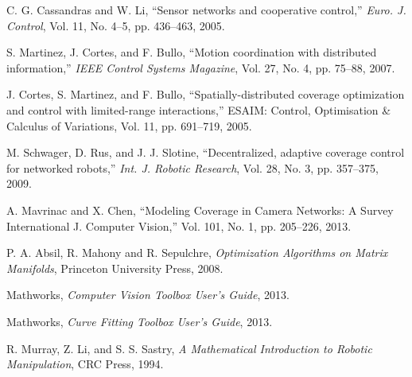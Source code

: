 \documentclass[conference,letterpaper]{ieeeconf}
\begin{document}
\begin{thebibliography}{99}
C. G. Cassandras and W. Li, 
``Sensor networks and cooperative control,''
{\it Euro. J. Control}, Vol. 11, No. 4--5, pp. 436--463, 2005.


S. Martinez, J. Cortes, and F. Bullo,
``Motion coordination with distributed information,'' 
{\it IEEE Control Systems Magazine}, Vol. 27, No. 4, pp. 75--88, 2007.

J. Cortes, S. Martinez, and F. Bullo, 
``Spatially-distributed coverage optimization and control with limited-range interactions,'' 
ESAIM: Control, Optimisation \& Calculus of Variations, Vol. 11, pp. 691--719, 2005.

M. Schwager, D. Rus, and J. J. Slotine,
``Decentralized, adaptive coverage
control for networked robots,'' 
{\it Int. J. Robotic Research}, Vol. 28, No. 3, pp. 357--375,
2009.




A. Mavrinac and X. Chen,
``Modeling Coverage in Camera Networks: A Survey
International J. Computer Vision,''
Vol. 101, No. 1, pp. 205--226, 2013.





P. A. Absil, R. Mahony and R. Sepulchre, {\it Optimization Algorithms on
Matrix Manifolds}, Princeton University Press, 2008.











Mathworks, {\it Computer Vision Toolbox User's Guide}, 2013.

Mathworks, {\it Curve Fitting Toolbox User's Guide}, 2013.

R. Murray, Z. Li, and S. S. Sastry, {\it A Mathematical Introduction to
Robotic Manipulation}, CRC Press, 1994.
\end{thebibliography}
\end{document}
